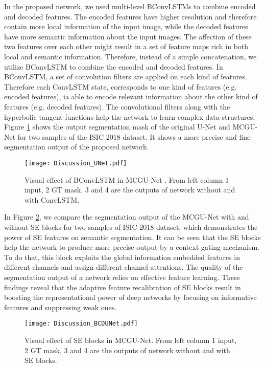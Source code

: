 \documentclass[journal]{IEEEtran}
\begin{document}
In the proposed network, we used multi-level BConvLSTMs to combine encoded and decoded features. The encoded features have higher resolution and therefore contain more local information of the input image, while the decoded features have more semantic information about the input images. The affection of these two features over each other might result in a set of feature maps rich in both local and semantic information. Therefore, instead of a simple concatenation, we utilize BConvLSTM to combine the encoded and decoded features. In BConvLSTM, a set of convolution filters are applied on each kind of features. Therefore each ConvLSTM state, corresponds to one kind of features (e.g. encoded features), ia able to encode relevant information about the other kind of features (e.g. decoded features). The convolutional filters along with the hyperbolic tangent functions help the network to learn complex data structures.
Figure \ref{figConvLSTM} shows the output segmentation mask of the original U-Net and MCGU-Net for two samples of the ISIC 2018 dataset. It shows a more precise and fine segmentation output of the proposed network. 

\begin{figure}
\centering
	\texttt{[image: Discussion\_UNet.pdf]}
	\caption{Visual effect of BConvLSTM in MCGU-Net . From left column 1 input, 2 GT mask, 3 and 4 are the outputs of network without and with ConvLSTM.} 
	 \vspace*{-\baselineskip}
	\label{figConvLSTM}
\end{figure}





In Figure \ref{figSE}, we compare the segmentation output of the MCGU-Net with and without SE blocks for two samples of ISIC 2018 dataset, which demonstrates the power of SE features on semantic segmentation. It can be seen that the SE blocks help the network to produce more precise output by a context gating mechanism. To do that, this block exploits the global information embedded features in different channels and assign different channel attentions. The quality of the segmentation output of a network relies on effective feature learning. These findings reveal that the adaptive feature recalibration of SE blocks result in boosting the representational power of deep networks by focusing on informative features and suppressing weak ones. 

\begin{figure}
\centering
	\texttt{[image: Discussion\_BCDUNet.pdf]}
	\caption{Visual effect of SE blocks in MCGU-Net.  From left column 1 input, 2 GT mask, 3 and 4 are the outputs of network without and with SE blocks. } 
	 \vspace*{-\baselineskip}
	\label{figSE}
\end{figure}
\end{document}
